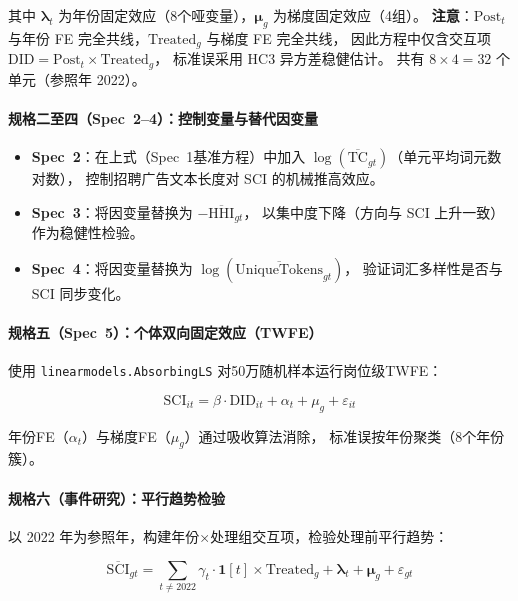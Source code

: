 \documentclass[12pt,a4paper]{ctexart}
\begin{document}
其中 $\boldsymbol{\lambda}_t$ 为年份固定效应（8个哑变量），$\boldsymbol{\mu}_g$ 为梯度固定效应（4组）。
\textbf{注意}：$\text{Post}_t$ 与年份 FE 完全共线，$\text{Treated}_g$ 与梯度 FE 完全共线，
因此方程中仅含交互项 $\text{DID} = \text{Post}_t \times \text{Treated}_g$，
标准误采用 HC3 异方差稳健估计。
共有 $8 \times 4 = 32$ 个单元（参照年 2022）。

\paragraph{规格二至四（Spec~2--4）：控制变量与替代因变量}

\begin{itemize}
    \item \textbf{Spec~2}：在上式（Spec~1基准方程）中加入 $\log(\overline{\text{TC}}_{gt})$（单元平均词元数对数），
    控制招聘广告文本长度对 SCI 的机械推高效应。
    \item \textbf{Spec~3}：将因变量替换为 $-\overline{\text{HHI}}_{gt}$，
    以集中度下降（方向与 SCI 上升一致）作为稳健性检验。
    \item \textbf{Spec~4}：将因变量替换为 $\log(\overline{\text{UniqueTokens}}_{gt})$，
    验证词汇多样性是否与 SCI 同步变化。
\end{itemize}

\paragraph{规格五（Spec~5）：个体双向固定效应（TWFE）}

使用 \texttt{linearmodels.AbsorbingLS} 对50万随机样本运行岗位级TWFE：

\begin{equation}
\label{eq:twfe}
\text{SCI}_{it} = \beta \cdot \text{DID}_{it} + \alpha_t + \mu_g + \varepsilon_{it}
\end{equation}

年份FE（$\alpha_t$）与梯度FE（$\mu_g$）通过吸收算法消除，
标准误按年份聚类（8个年份簇）。

\paragraph{规格六（事件研究）：平行趋势检验}

以 2022 年为参照年，构建年份×处理组交互项，检验处理前平行趋势：

\begin{equation}
\label{eq:event}
\overline{\text{SCI}}_{gt} = \sum_{t \neq 2022} \gamma_t \cdot \mathbf{1}[t] \times \text{Treated}_g
+ \boldsymbol{\lambda}_t + \boldsymbol{\mu}_g + \varepsilon_{gt}
\end{equation}
\end{document}
